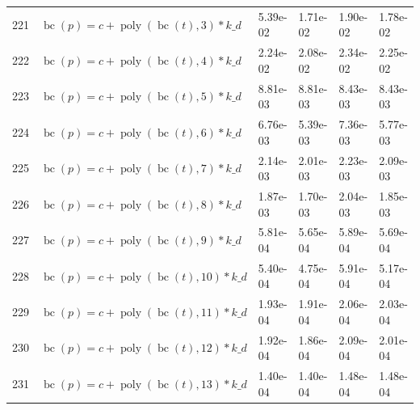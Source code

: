 \documentclass[12pt,a4paper]{article}
\DeclareMathOperator{\bc}{bc}
\DeclareMathOperator{\poly}{poly}
\begin{document}
\begin{longtable}[t]{ll>{\raggedleft\arraybackslash}p{2cm}>{\raggedleft\arraybackslash}p{2cm}>{\raggedleft\arraybackslash}p{2cm}>{\raggedleft\arraybackslash}p{2cm}}
\rowcolor{gray!6}  221 & $\bc(p) = c + \poly\left( \bc(t), 3 \right) * k\_d$ & 5.39e-02 & 1.71e-02 & 1.90e-02 & 1.78e-02\\
222 & $\bc(p) = c + \poly\left( \bc(t), 4 \right) * k\_d$ & 2.24e-02 & 2.08e-02 & 2.34e-02 & 2.25e-02\\
\rowcolor{gray!6}  223 & $\bc(p) = c + \poly\left( \bc(t), 5 \right) * k\_d$ & 8.81e-03 & 8.81e-03 & 8.43e-03 & 8.43e-03\\
224 & $\bc(p) = c + \poly\left( \bc(t), 6 \right) * k\_d$ & 6.76e-03 & 5.39e-03 & 7.36e-03 & 5.77e-03\\
\rowcolor{gray!6}  225 & $\bc(p) = c + \poly\left( \bc(t), 7 \right) * k\_d$ & 2.14e-03 & 2.01e-03 & 2.23e-03 & 2.09e-03\\
226 & $\bc(p) = c + \poly\left( \bc(t), 8 \right) * k\_d$ & 1.87e-03 & 1.70e-03 & 2.04e-03 & 1.85e-03\\
\rowcolor{gray!6}  227 & $\bc(p) = c + \poly\left( \bc(t), 9 \right) * k\_d$ & 5.81e-04 & 5.65e-04 & 5.89e-04 & 5.69e-04\\
228 & $\bc(p) = c + \poly\left( \bc(t), 10 \right) * k\_d$ & 5.40e-04 & 4.75e-04 & 5.91e-04 & 5.17e-04\\
\rowcolor{gray!6}  229 & $\bc(p) = c + \poly\left( \bc(t), 11 \right) * k\_d$ & 1.93e-04 & 1.91e-04 & 2.06e-04 & 2.03e-04\\
230 & $\bc(p) = c + \poly\left( \bc(t), 12 \right) * k\_d$ & 1.92e-04 & 1.86e-04 & 2.09e-04 & 2.01e-04\\
\rowcolor{gray!6}  231 & $\bc(p) = c + \poly\left( \bc(t), 13 \right) * k\_d$ & 1.40e-04 & 1.40e-04 & 1.48e-04 & 1.48e-04\\*
\end{longtable}
\endgroup{}

\begingroup\fontsize{10}{12}\selectfont
\end{document}

